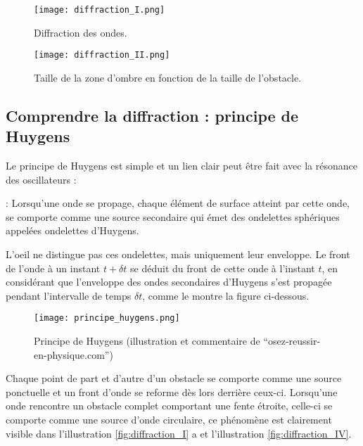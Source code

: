 \begin{figure}[ht]
    \begin{minipage}{.5\textwidth}
        \centering
        \texttt{[image: diffraction\_I.png]}
        \caption{Diffraction des ondes.}
        \label{fig:diffraction_I}
    \end{minipage}
    \begin{minipage}{.5\textwidth}
        \centering
        \texttt{[image: diffraction\_II.png]}
        \caption{Taille de la zone d'ombre en fonction de la taille de l'obstacle.}
        \label{fig:diffraction_II}
    \end{minipage}
\end{figure}

\newpage

\subsection{Comprendre la diffraction : principe de Huygens}
Le principe de Huygens est simple et un lien clair peut être fait avec la résonance des oscillateurs :
\begin{encadre}
     : Lorsqu'une onde se propage, chaque élément de surface atteint par cette onde, se comporte comme une source secondaire qui émet des ondelettes sphériques appelées ondelettes d'Huygens.
\end{encadre}
L'oeil ne distingue pas ces ondelettes, mais uniquement leur enveloppe. Le front de l'onde à un instant \(t+\delta t\) se déduit du front de cette onde à l'instant \(t\), en considérant que l'enveloppe des ondes secondaires d'Huygens s'est propagée pendant l'intervalle de temps \(\delta t\), comme le montre la figure ci-dessous.

\begin{figure}[ht]
    \centering
    \texttt{[image: principe\_huygens.png]}
    \caption{Principe de Huygens (illustration et commentaire de \enquote{osez-reussir-en-physique.com})}
\end{figure}

Chaque point de part et d'autre d'un obstacle se comporte comme une source ponctuelle et un front d'onde se reforme dès lors derrière ceux-ci.
Lorsqu'une onde rencontre un obstacle complet comportant une fente étroite, celle-ci se comporte comme une source d'onde circulaire, ce phénomène est clairement visible dans l'illustration \ref{fig:diffraction_I} a et l'illustration \ref{fig:diffraction_IV}.

